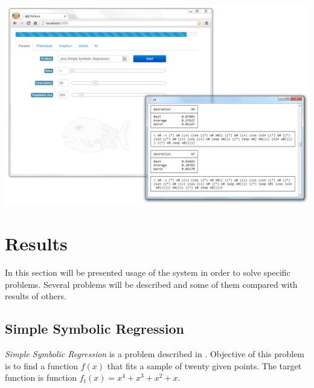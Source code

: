 \documentclass[12pt,a4paper]{report}
\begin{document}
~\\[6em]

\includegraphics[scale=0.4]{skryn.png}

\chapter{Results}
	In this section will be presented usage of the system in order to solve specific problems. Several problems will be described and some of them compared with results
of others. 

\section{Simple Symbolic Regression}

\textit{Simple Symbolic Regression} is a problem described
in \cite{koza92}. Objective of this problem is to 
find a function $f(x)$ that fits a sample
of twenty given points. The target function is 
function $f_{t}(x) = x^4 + x^3 + x^2 + x$.  
\end{document}
